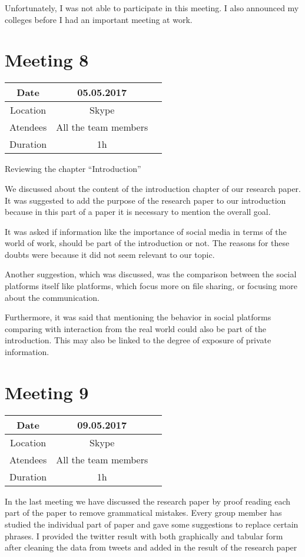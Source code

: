 Unfortunately, I was not able to participate in this meeting. I also announced my colleges before I had an important meeting at work.

\section{Meeting 8}
\begin{center}
	\begin{tabular}{| c | c | c }
		\hline
		Date &  05.05.2017   \\
		\hline
		Location & Skype  \\
		\hline
		Atendees & All the team members   \\
		\hline
		Duration & 1h  \\
		\hline
	\end{tabular}
\end{center}

Reviewing the chapter “Introduction”

We discussed about the content of the introduction chapter
of our research paper. It was suggested to add the purpose
of the research paper to our introduction because in this part
of a paper it is necessary to mention the overall goal.

It was asked if information like the importance of social
media in terms of the world of work, should be part of the
introduction or not. The reasons for these doubts were
because it did not seem relevant to our topic.

Another suggestion, which was discussed, was the
comparison between the social platforms itself like platforms,
which focus more on file sharing, or focusing more about the
communication.

Furthermore, it was said that mentioning the behavior in
social platforms comparing with interaction from the real
world could also be part of the introduction. This may also
be linked to the degree of exposure of private information.
\section{Meeting 9}
\begin{center}
	\begin{tabular}{| c | c | c }
		\hline
		Date & 	09.05.2017   \\
		\hline
		Location & Skype  \\
		\hline
		Atendees & All the team members   \\
		\hline
		Duration & 1h  \\
		\hline
	\end{tabular}
\end{center}


In the last meeting we have discussed the research paper by proof reading each part of the paper to remove grammatical mistakes. Every group member has studied the individual part of paper
and gave some suggestions to replace certain phrases. I provided the twitter result with both graphically and tabular form after cleaning the data from tweets and
added in the result of the research paper

